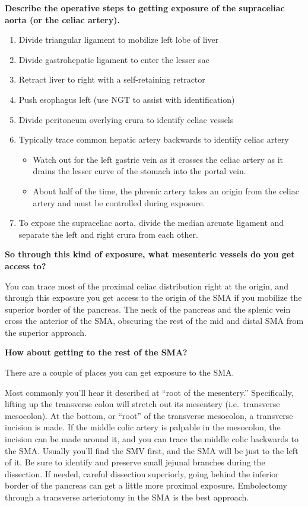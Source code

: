 \documentclass[
]{book}
\begin{document}
\textbf{Describe the operative steps to getting exposure of the supraceliac
aorta (or the celiac artery).}

\begin{enumerate}
\def\labelenumi{\arabic{enumi}.}
\item
  Divide triangular ligament to mobilize left lobe of liver
\item
  Divide gastrohepatic ligament to enter the lesser sac~
\item
  Retract liver to right with a self-retaining retractor
\item
  Push esophagus left (use NGT to assist with identification)
\item
  Divide peritoneum overlying crura to identify celiac vessels
\item
  Typically trace common hepatic artery backwards to identify celiac
  artery

  \begin{itemize}
  \item
    Watch out for the left gastric vein as it crosses the celiac
    artery as it drains the lesser curve of the stomach into the
    portal vein.
  \item
    About half of the time, the phrenic artery takes an origin from
    the celiac artery and must be controlled during exposure.
  \end{itemize}
\item
  To expose the supraceliac aorta, divide the median arcuate ligament
  and separate the left and right crura from each other.
\end{enumerate}

\textbf{So through this kind of exposure, what mesenteric vessels do you get
access to?}

You can trace most of the proximal celiac distribution right at the
origin, and through this exposure you get access to the origin of the
SMA if you mobilize the superior border of the pancreas. The neck of the
pancreas and the splenic vein cross the anterior of the SMA, obscuring
the rest of the mid and distal SMA from the superior approach.

\textbf{How about getting to the rest of the SMA?}

There are a couple of places you can get exposure to the SMA.~

Most commonly you'll hear it described at ``root of the mesentery.''
Specifically, lifting up the transverse colon will stretch out its
mesentery (i.e.~transverse mesocolon). At the bottom, or ``root'' of the
transverse mesocolon, a transverse incision is made. If the middle colic
artery is palpable in the mesocolon, the incision can be made around it,
and you can trace the middle colic backwards to the SMA. Usually you'll
find the SMV first, and the SMA will be just to the left of it. Be sure
to identify and preserve small jejunal branches during the dissection.
If needed, careful dissection superiorly, going behind the inferior
border of the pancreas can get a little more proximal exposure.
Embolectomy through a transverse arteriotomy in the SMA is the best
approach.\citep{kazmersOperativeManagementAcute1998}
\end{document}
